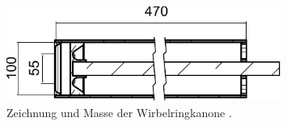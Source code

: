 \begin{figure}
\centering
\includegraphics[width=0.8\textwidth]{papers/wirbelringe/fig/zeichnung.pdf}
\caption{Zeichnung und Masse der Wirbelringkanone \cite{Wirbelringe:3D_modelle}. \label{Wirbelringe:fig:zeichnung}}
\end{figure}